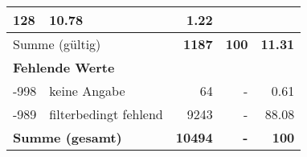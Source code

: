 \begin{longtable}{lXrrr}
       \num{128} &
       \num[round-mode=places,round-precision=2]{10,78} &
         \num[round-mode=places,round-precision=2]{1,22} \\
     \midrule
     \multicolumn{2}{l}{Summe (gültig)} &
       \textbf{\num{1187}} &
     \textbf{100} &
       \textbf{\num[round-mode=places,round-precision=2]{11,31}} \\
     \multicolumn{5}{l}{\textbf{Fehlende Werte}}\\
       -998 &
       keine Angabe &
         \num{64} &
        - &
         \num[round-mode=places,round-precision=2]{0,61} \\
       -989 &
       filterbedingt fehlend &
         \num{9243} &
        - &
         \num[round-mode=places,round-precision=2]{88,08} \\
     \midrule
     \multicolumn{2}{l}{\textbf{Summe (gesamt)}} &
          \textbf{\num{10494}} &
        \textbf{-} &
        \textbf{100} \\
     \bottomrule
     \end{longtable}
     
